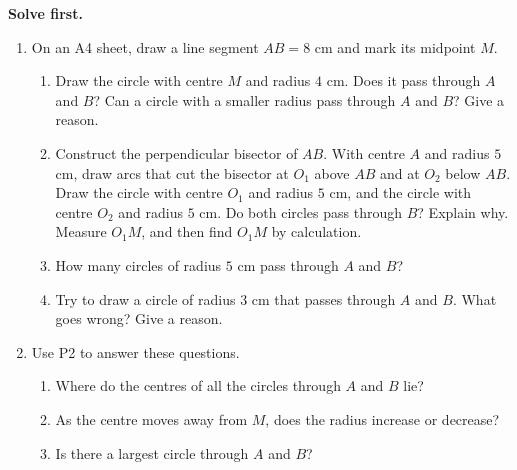 \documentclass[11pt,a4paper]{article}
\theoremstyle{branddef}
\newcounter{prob}
\newenvironment{solvefirst}
  {\par\smallskip\noindent\textbf{Solve first.}
   \begin{enumerate}[label=\textbf{P\arabic*.},leftmargin=2.2em,itemsep=3pt,start=\numexpr\value{prob}+1\relax]}
  {\setcounter{prob}{\value{enumi}}\end{enumerate}}
\begin{document}
\begin{solvefirst}
  \item On an A4 sheet, draw a line segment $AB=8$ cm and mark its midpoint $M$.
  \begin{enumerate}[label=(\alph*),itemsep=1pt]
    \item Draw the circle with centre $M$ and radius $4$ cm. Does it pass through $A$ and $B$? Can a circle with a smaller radius pass through $A$ and $B$? Give a reason.
    \item Construct the perpendicular bisector of $AB$. With centre $A$ and radius $5$ cm, draw arcs that cut the bisector at $O_1$ above $AB$ and at $O_2$ below $AB$. Draw the circle with centre $O_1$ and radius $5$ cm, and the circle with centre $O_2$ and radius $5$ cm. Do both circles pass through $B$? Explain why. Measure $O_1M$, and then find $O_1M$ by calculation.
    \item How many circles of radius $5$ cm pass through $A$ and $B$?
    \item Try to draw a circle of radius $3$ cm that passes through $A$ and $B$. What goes wrong? Give a reason.
  \end{enumerate}
  \item Use P2 to answer these questions.
  \begin{enumerate}[label=(\alph*),itemsep=1pt]
    \item Where do the centres of all the circles through $A$ and $B$ lie?
    \item As the centre moves away from $M$, does the radius increase or decrease?
    \item Is there a largest circle through $A$ and $B$?
  \end{enumerate}
\end{solvefirst}
\end{document}
